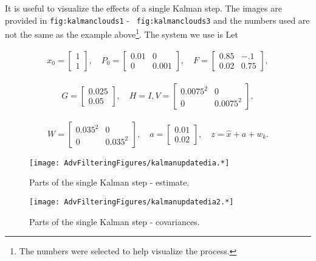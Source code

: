 It is useful to visualize the effects of a single Kalman step. The
images are provided in \texttt{fig:kalmanclouds1} -
~\texttt{fig:kalmanclouds3} and the numbers used are not the same as the
example above\footnote{The numbers were selected to help visualize the
  process.}. The system we use is Let

\[\begin{aligned}
x_0 = \begin{bmatrix} 1\\1\end{bmatrix}, \quad P_0 = \begin{bmatrix}0.01& 0\\ 0&0.001\end{bmatrix}, \quad F = \begin{bmatrix} 0.85 &-.1 \\0.02 &0.75\end{bmatrix},
\end{aligned}\]

\[\begin{aligned}
G = \begin{bmatrix} 0.025\\ 0.05\end{bmatrix}, \quad H = I,
 V = \begin{bmatrix} 0.0075^2&0\\0& 0.0075^2\end{bmatrix},
\end{aligned}\]

\[\begin{aligned}
W = \begin{bmatrix} 0.035^2&0\\0& 0.035^2\end{bmatrix}, \quad  a = \begin{bmatrix} 0.01\\ 0.02\end{bmatrix} ,\quad z = \hat{x}  +a+ w_k.
\end{aligned}\]

\begin{figure}
\centering
\texttt{[image: AdvFilteringFigures/kalmanupdatedia.*]}
\caption{Parts of the single Kalman step - estimate.}
\end{figure}

\begin{figure}
\centering
\texttt{[image: AdvFilteringFigures/kalmanupdatedia2.*]}
\caption{Parts of the single Kalman step - covariances.}
\end{figure}

